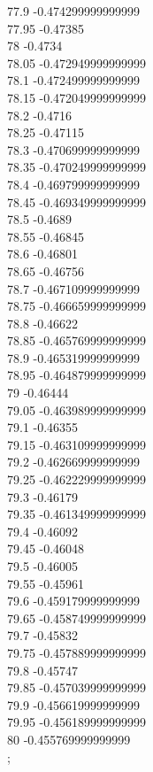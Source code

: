 {77.9	-0.474299999999999\\
77.95	-0.47385\\
78	-0.4734\\
78.05	-0.472949999999999\\
78.1	-0.472499999999999\\
78.15	-0.472049999999999\\
78.2	-0.4716\\
78.25	-0.47115\\
78.3	-0.470699999999999\\
78.35	-0.470249999999999\\
78.4	-0.469799999999999\\
78.45	-0.469349999999999\\
78.5	-0.4689\\
78.55	-0.46845\\
78.6	-0.46801\\
78.65	-0.46756\\
78.7	-0.467109999999999\\
78.75	-0.466659999999999\\
78.8	-0.46622\\
78.85	-0.465769999999999\\
78.9	-0.465319999999999\\
78.95	-0.464879999999999\\
79	-0.46444\\
79.05	-0.463989999999999\\
79.1	-0.46355\\
79.15	-0.463109999999999\\
79.2	-0.462669999999999\\
79.25	-0.462229999999999\\
79.3	-0.46179\\
79.35	-0.461349999999999\\
79.4	-0.46092\\
79.45	-0.46048\\
79.5	-0.46005\\
79.55	-0.45961\\
79.6	-0.459179999999999\\
79.65	-0.458749999999999\\
79.7	-0.45832\\
79.75	-0.457889999999999\\
79.8	-0.45747\\
79.85	-0.457039999999999\\
79.9	-0.456619999999999\\
79.95	-0.456189999999999\\
80	-0.455769999999999\\
};
